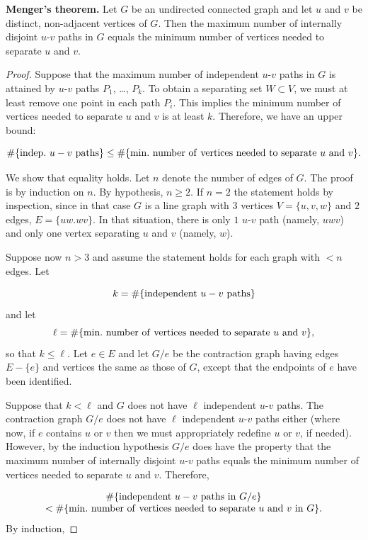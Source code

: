 \begin{theorem}
\label{thm:distance_connectivity:Menger_theorem}
\textbf{Menger's theorem.}
Let $G$ be an undirected connected graph and let $u$ and $v$ be
distinct, non-adjacent vertices of $G$. Then the maximum number of
internally disjoint $u$-$v$ paths in $G$ equals the minimum number of
vertices needed to separate $u$ and $v$.
\end{theorem}

\begin{proof}
Suppose that the maximum number of independent $u$-$v$ paths in
$G$ is attained by $u$-$v$ paths $P_1$, \dots, $P_k$.
To obtain a separating set $W\subset V$, we must at least remove
one point in each path $P_i$. This implies
the minimum number of vertices needed to separate $u$ and $v$
is at least $k$. Therefore, we have an upper bound:

\[
\#\{ {\rm indep.}\ u-v\ {\rm paths}\}
\leq
\# \{{\rm min.\ number \ of\ vertices\ needed\ to\ separate}\ u\
{\rm and}\  v\}.
\]

We show that equality holds. Let $n$ denote the number
of edges of $G$. The proof is by induction on $n$. By hypothesis,
$n\geq 2$.
If $n=2$ the statement holds by inspection, since in that case
$G$ is a line graph with $3$ vertices
$V=\{u,v,w\}$ and $2$ edges, $E=\{uw.wv\}$. In that situation,
there is only $1$ $u$-$v$ path
(namely, $uwv$) and only one vertex separating $u$ and $v$
(namely, $w$).

Suppose now $n>3$ and assume the statement holds for each
graph with $<n$ edges. Let

\[
k = \#\{ {\rm independent}\ u-v\ {\rm paths}\}
\]
and let
\[
\ell =
\# \{{\rm min.\ number \ of\ vertices\ needed\ to\ separate}\
u\ {\rm and}\  v\},
\]
so that $k\leq \ell$. Let $e\in E$ and let $G/e$ be the
contraction graph having edges $E-\{e\}$ and
vertices the same as those of $G$, except that
the endpoints of $e$ have been identified.

Suppose that $k<\ell$ and $G$ does not have $\ell$
independent $u$-$v$ paths. The contraction
graph $G/e$ does not have $\ell$
independent $u$-$v$ paths either (where
now, if $e$ contains $u$ or $v$ then we must
appropriately redefine $u$ or $v$, if needed).
However, by the induction hypothesis
$G/e$ does have the property that
the maximum number of internally disjoint $u$-$v$ paths
equals the minimum number of vertices needed to separate $u$ and $v$.
Therefore,

\[
\begin{array}{c}
\#\{ {\rm independent}\ u-v\ {\rm paths\ in}\ G/e\}\\
<
\# \{{\rm min.\ number \ of\ vertices\ needed\ to\ separate}
\ u\ {\rm and}\  v\ {\rm in}\ G\}.
\end{array}
\]
By induction,


\end{proof}
